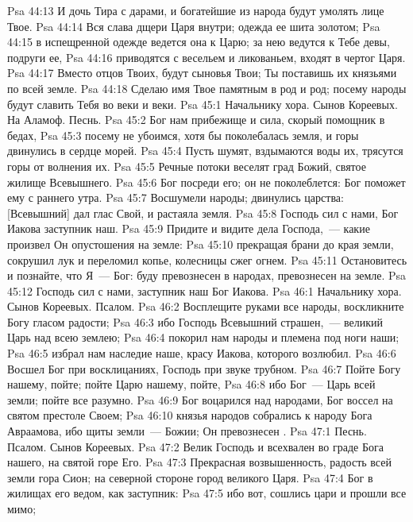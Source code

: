 \vs Psa 44:13 И дочь Тира с дарами, и богатейшие из народа будут умолять лице Твое.
\vs Psa 44:14 Вся слава дщери Царя внутри; одежда ее шита золотом;
\vs Psa 44:15 в испещренной одежде ведется она к Царю; за нею ведутся к Тебе девы, подруги ее,
\vs Psa 44:16 приводятся с весельем и ликованьем, входят в чертог Царя.
\vs Psa 44:17 Вместо отцов Твоих, будут сыновья Твои; Ты поставишь их князьями по всей земле.
\vs Psa 44:18 Сделаю имя Твое памятным в род и род; посему народы будут славить Тебя во веки и веки.
\vs Psa 45:1 Начальнику хора. Сынов Кореевых. На  Аламоф. Песнь.
\rsbpar\vs Psa 45:2 Бог нам прибежище и сила, скорый помощник в бедах,
\vs Psa 45:3 посему не убоимся, хотя бы поколебалась земля, и горы двинулись в сердце морей.
\vs Psa 45:4 Пусть шумят, вздымаются воды их, трясутся горы от волнения их.
\vs Psa 45:5 Речные потоки веселят град Божий, святое жилище Всевышнего.
\vs Psa 45:6 Бог посреди его; он не поколеблется: Бог поможет ему с раннего утра.
\vs Psa 45:7 Восшумели народы; двинулись царства: [Всевышний] дал глас Свой, и растаяла земля.
\vs Psa 45:8 Господь сил с нами, Бог Иакова заступник наш.
\vs Psa 45:9 Придите и видите дела Господа,~--- какие произвел Он опустошения на земле:
\vs Psa 45:10 прекращая брани до края земли, сокрушил лук и переломил копье, колесницы сжег огнем.
\vs Psa 45:11 Остановитесь и познайте, что Я~--- Бог: буду превознесен в народах, превознесен на земле.
\vs Psa 45:12 Господь сил с нами, заступник наш Бог Иакова.
\vs Psa 46:1 Начальнику хора. Сынов Кореевых. Псалом.
\rsbpar\vs Psa 46:2 Восплещите руками все народы, воскликните Богу гласом радости;
\vs Psa 46:3 ибо Господь Всевышний страшен,~--- великий Царь над всею землею;
\vs Psa 46:4 покорил нам народы и племена под ноги наши;
\vs Psa 46:5 избрал нам наследие наше, красу Иакова, которого возлюбил.
\vs Psa 46:6 Восшел Бог при восклицаниях, Господь при звуке трубном.
\vs Psa 46:7 Пойте Богу нашему, пойте; пойте Царю нашему, пойте,
\vs Psa 46:8 ибо Бог~--- Царь всей земли; пойте все разумно.
\vs Psa 46:9 Бог воцарился над народами, Бог воссел на святом престоле Своем;
\vs Psa 46:10 князья народов собрались к народу Бога Авраамова, ибо щиты земли~--- Божии; Он превознесен .
\vs Psa 47:1 Песнь. Псалом. Сынов Кореевых.
\rsbpar\vs Psa 47:2 Велик Господь и всехвален во граде Бога нашего, на святой горе Его.
\vs Psa 47:3 Прекрасная возвышенность, радость всей земли гора Сион; на северной стороне  город великого Царя.
\vs Psa 47:4 Бог в жилищах его ведом, как заступник:
\vs Psa 47:5 ибо вот, сошлись цари и прошли все мимо;
